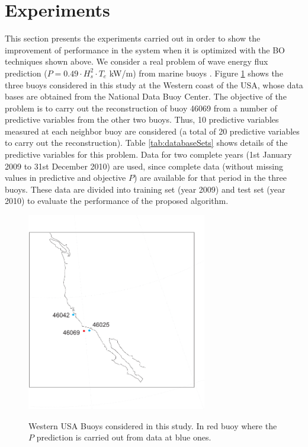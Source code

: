 \section{Experiments}\label{sec:Experiments}
This section presents the experiments carried out in order to show the improvement of performance in the system when it is optimized with the BO techniques shown above. We consider a real problem of wave energy flux prediction ($P =  0.49\cdot   H_s^2 \cdot T_e$ kW/m) from marine buoys \citep{yoshimi2010random}. Figure \ref{boyas_con_b} shows the three buoys considered in this study at the Western coast of the USA, whose data bases are obtained from the National Data Buoy Center. The objective of the problem is to carry out the reconstruction of buoy 46069 from a number of predictive variables from the other two buoys. Thus, 10 predictive variables measured at each neighbor buoy are considered (a total of 20 predictive variables to carry out the reconstruction). Table \ref{tab:databaseSets} shows details of the predictive variables for this problem. Data for two complete years (1st January 2009 to 31st December 2010) are used, since complete data (without missing values in predictive and objective $P$) are available for that period in the three buoys. These data are divided into training set (year 2009) and test set (year 2010) to evaluate the performance of the proposed algorithm.

\begin{figure}[htbp]
\centering
\includegraphics[width=0.7\textwidth]{Figures/alcala/Mapa_boyas_con_b_California.pdf} \\
\caption{\label{boyas_con_b} Western USA Buoys considered in this study. In red buoy where the $P$ prediction is carried out from data at blue ones.}
\end{figure}

